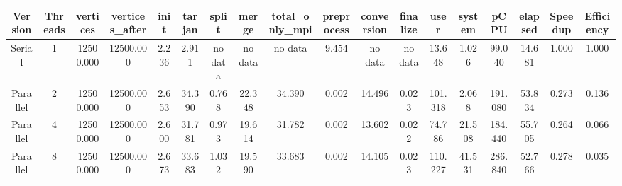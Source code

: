 \begin{tabular}{|c|c|c|c|c|c|c|c|c|c|c|c|c|c|c|c|c|c|}
\toprule
 Version &  Threads &  vertices &  vertices\_after &  init &  tarjan &   split &   merge & total\_only\_mpi &  preprocess & conversion & finalize &    user &  system &    pCPU &  elapsed &  Speedup &  Efficiency \\
\midrule
  Serial &        1 & 12500.000 &       12500.000 & 2.236 &   2.911 & no data & no data &        no data &       9.454 &    no data &  no data &  13.648 &   1.026 &  99.040 &   14.681 &    1.000 &       1.000 \\
Parallel &        2 & 12500.000 &       12500.000 & 2.653 &  34.390 &   0.768 &  22.348 &         34.390 &       0.002 &     14.496 &    0.023 & 101.318 &   2.068 & 191.080 &   53.834 &    0.273 &       0.136 \\
Parallel &        4 & 12500.000 &       12500.000 & 2.600 &  31.781 &   0.973 &  19.614 &         31.782 &       0.002 &     13.602 &    0.022 &  74.786 &  21.508 & 184.440 &   55.705 &    0.264 &       0.066 \\
Parallel &        8 & 12500.000 &       12500.000 & 2.673 &  33.683 &   1.032 &  19.590 &         33.683 &       0.002 &     14.105 &    0.023 & 110.227 &  41.531 & 286.840 &   52.766 &    0.278 &       0.035 \\
\bottomrule
\end{tabular}
